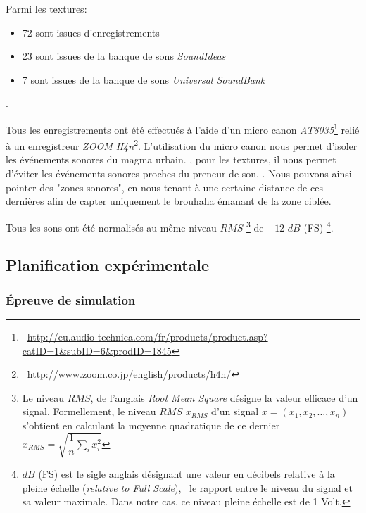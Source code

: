 Parmi les textures:

\begin{itemize}
\item 72 sont issues d’enregistrements
\item 23 sont issues de la banque de sons \emph{SoundIdeas}
\item 7 sont issues de la banque de sons \emph{Universal SoundBank}
\end{itemize}

.

Tous les enregistrements ont été effectués à l’aide d'un micro canon \emph{AT8035}\footnote{\Cf~\url{http://eu.audio-technica.com/fr/products/product.asp?catID=1&subID=6&prodID=1845}} relié à un enregistreur \emph{ZOOM H4n}\footnote{\Cf~\url{http://www.zoom.co.jp/english/products/h4n/}}. L’utilisation du micro canon nous permet d’isoler les événements sonores du magma urbain. , pour les textures, il nous permet d’éviter les événements sonores proches du preneur de son, . Nous pouvons ainsi pointer des "zones sonores", en nous tenant à une certaine distance de ces dernières afin de capter uniquement le brouhaha émanant de la zone ciblée.

Tous les sons ont été normalisés au même niveau $RMS$ \footnote{Le niveau $RMS$, de l'anglais \emph{Root Mean Square}  désigne la valeur efficace d'un signal. Formellement, le niveau $RMS$ $x_{RMS}$ d'un signal $x=(x_1,x_2,\ldots,x_n)$ s'obtient en calculant la moyenne quadratique de ce dernier $x_{RMS}=\sqrt{\dfrac{1}{n}\sum\limits_{i} x_i^2}$} de $-12$ $dB$ (FS) \footnote{$dB$ (FS) est le sigle anglais désignant une valeur en décibels relative à la pleine échelle (\emph{relative to Full Scale}), \ie~le rapport entre le niveau du signal et sa valeur maximale. Dans notre cas, ce niveau pleine échelle est de 1 Volt.}.

\subsection{Planification expérimentale}

\subsubsection{Épreuve de simulation}
\label{sec:ch5_planExpSimu}

